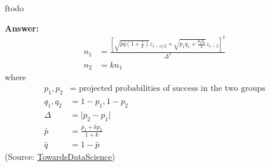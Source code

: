 ƒtodo\documentclass{article}
\newenvironment{QandA}{\begin{enumerate}[label=\arabic*.]}{\end{enumerate}}
\newenvironment{answer}{\par\normalfont \textbf{Answer:}}{}
\begin{document}
\begin{QandA}
\begin{answer}
        \begin{align*}
            n_1 &= \frac{\left[ \sqrt{\bar{p}\bar{q} \left(1 + \frac{1}{k} \right)}z_{1- \alpha/2} + \sqrt{p_1q_1 + \frac{p_2q_2}{k}}z_{1-\beta} \right]^2}{\Delta^2} \\
            n_2 &= k n_1
        \end{align*}
        where 
        \begin{align*}
            p_1, p_2 &= \text{ projected probabilities of success in the two groups} \\
            q_1, q_2 &= 1-p_1, 1-p_2 \\
            \Delta &= \vert p_2 - p_1 \vert \\
            \bar{p} &= \frac{p_1 + k p_2}{1 + k} \\
            \bar{q} &= 1 - \bar{p}
        \end{align*}
        (Source: \href{https://towardsdatascience.com/required-sample-size-for-a-b-testing-6f6608dd330a}{TowardsDataScience})
    \end{answer}


\end{QandA}
\end{document}
